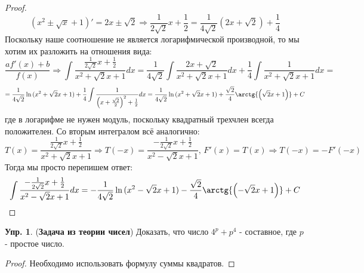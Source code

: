 \documentclass[12pt]{article}
\theoremstyle{definition}
\newtheorem{exrc}{Упр.}
\DeclareMathOperator{\dint}{\displaystyle\int}
\begin{document}
\begin{proof}
	$$
		(x^2 \pm \sqrt{x} + 1)' = 2x \pm \sqrt{2} \Rightarrow \dfrac{1}{2\sqrt{2}}x + \dfrac{1}{2} = \dfrac{1}{4\sqrt{2}}(2x + \sqrt{2}) + \dfrac{1}{4}
	$$
	Поскольку наше соотношение не является логарифмической производной, то мы хотим их разложить на отношения вида:
	$$
		\dfrac{af'(x) + b}{f(x)} \Rightarrow \dint \dfrac{\frac{1}{2\sqrt{2}}x + \frac{1}{2}}{x^2 + \sqrt{2}x + 1}dx = \dfrac{1}{4\sqrt{2}}\dint \dfrac{2x + \sqrt{2}}{x^2 + \sqrt{2}x + 1}dx + \dfrac{1}{4}\dint\dfrac{1}{x^2 + \sqrt{2}x + 1}dx =
	$$
	$$
		= \dfrac{1}{4\sqrt{2}}	\ln{(x^2 +\sqrt{2}x + 1)} + \dfrac{1}{4}\dint \dfrac{1}{\left(x + \frac{\sqrt{2}}{2}\right)^2+ \frac{1}{2}}dx =  \dfrac{1}{4\sqrt{2}}\ln{(x^2 +\sqrt{2}x + 1)} + \dfrac{\sqrt{2}}{4}\arctg{\left(\sqrt{2}x + 1\right)} + C
	$$
	где в логарифме не нужен модуль, поскольку квадратный трехчлен всегда положителен. Со вторым интегралом всё аналогично:
	$$
		T(x) = \dfrac{\frac{1}{2\sqrt{2}}x + \frac{1}{2}}{x^2 + \sqrt{2}x + 1} \Rightarrow T(-x) = \dfrac{-\frac{1}{2\sqrt{2}}x + \frac{1}{2}}{x^2 - \sqrt{2}x + 1}, \, F'(x) = T(x) \Rightarrow T(-x) = -F'(-x)
	$$
	Тогда мы просто перепишем ответ:
	$$
		\dint \dfrac{-\frac{1}{2\sqrt{2}}x + \frac{1}{2}}{x^2 - \sqrt{2}x + 1} dx = - \dfrac{1}{4\sqrt{2}}\ln{(x^2 -\sqrt{2}x + 1)} - \dfrac{\sqrt{2}}{4}\arctg{\left(-\sqrt{2}x + 1\right)} + C
	$$
\end{proof}

\begin{exrc}(\textbf{Задача из теории чисел}) 
	Доказать, что число $4^p + p^4$ - составное, где $p$ - простое число.
\end{exrc}
\begin{proof}
	Необходимо использовать формулу суммы квадратов.
\end{proof}
\end{document}
